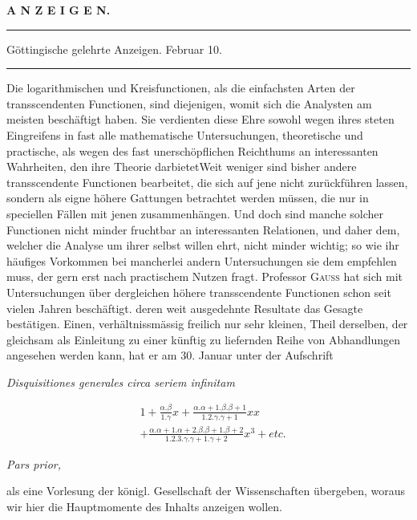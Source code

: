 \clearpage{}
\begin{center}\textbf{A N Z E I G E N.}\end{center}
\par{}\begin{center}
\rule{0.52\linewidth}{0.3pt}\par\medskip
Göttingische gelehrte Anzeigen. Februar 10.\par\medskip
\rule{0.52\linewidth}{0.3pt}
\end{center}

Die logarithmischen und Kreisfunctionen, als die einfachsten Arten der
transscendenten Functionen, sind diejenigen, womit sich die Analysten am
meisten beschäftigt haben. Sie verdienten diese Ehre sowohl wegen ihres steten
Eingreifens in fast alle mathematische Untersuchungen, theoretische und practische,
als wegen des fast unerschöpflichen Reichthums an interessanten Wahrheiten, den
ihre Theorie darbietet\quad Weit weniger sind bisher andere transscendente Functionen
bearbeitet, die sich auf jene nicht zurückführen lassen, sondern als eigne
höhere Gattungen betrachtet werden müssen, die nur in speciellen Fällen mit
jenen zusammenhängen. Und doch sind manche solcher Functionen nicht minder
fruchtbar an interessanten Relationen, und daher dem, welcher die Analyse um
ihrer selbst willen ehrt, nicht minder wichtig; so wie ihr häufiges Vorkommen
bei mancherlei andern Untersuchungen sie dem empfehlen muss, der gern erst
nach practischem Nutzen fragt. Professor \textsc{Gauss} hat sich mit Untersuchungen
über dergleichen höhere transscendente Functionen schon seit vielen Jahren
beschäftigt. deren weit ausgedehnte Resultate das Gesagte bestätigen. Einen,
verhältnissmässig freilich nur sehr kleinen, Theil derselben, der gleichsam als
Einleitung zu einer künftig zu liefernden Reihe von Abhandlungen angesehen werden
kann, hat er am 30. Januar unter der Aufschrift

\begin{center}\emph{Disquisitiones generales circa seriem infinitam}\end{center}
\[
\begin{aligned}&1+\frac{\alpha.\beta}{1.\gamma}x
+\frac{\alpha.\alpha+1.\beta.\beta+1}{1.2.\gamma.\gamma+1}xx
\\[5pt]&+\frac{\alpha.\alpha+1.\alpha+2.\beta.\beta+1.\beta+2}{1.2.3.\gamma.\gamma+1.\gamma+2}x^3+\mathit{etc.}\end{aligned}
\]
\begin{center}\emph{Pars prior,}\end{center}
als eine Vorlesung der königl. Gesellschaft der Wissenschaften übergeben, woraus
wir hier die Hauptmomente des Inhalts anzeigen wollen.

